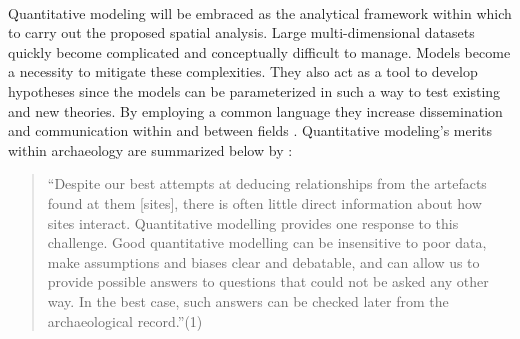 \documentclass[12pt,a4paper]{thesis}
\begin{document}
\paragraph{}
Quantitative modeling will be embraced as the analytical framework within which to carry out the proposed spatial 
analysis. Large multi-dimensional datasets quickly become complicated and conceptually difficult to manage. Models become a necessity to mitigate these complexities. They also act as a tool to develop hypotheses since the models can be parameterized in such a way to test existing and new theories. By employing a common language they increase dissemination and communication within and between fields \citep{Wyl09}. Quantitative modeling's merits within archaeology are summarized below by \citep{ERK12}:

    
\begin{quote}
        ``Despite our best attempts at deducing relationships from the artefacts found at them [sites], there is often little direct information about how sites interact. Quantitative modelling provides one response to this challenge. Good quantitative modelling can be insensitive to poor data, make assumptions and biases clear and debatable, and can allow us to provide possible answers to questions that could not be asked any other way. In the best case, such answers can be checked later from the archaeological record.''(1)
\end{quote}
\end{document}
